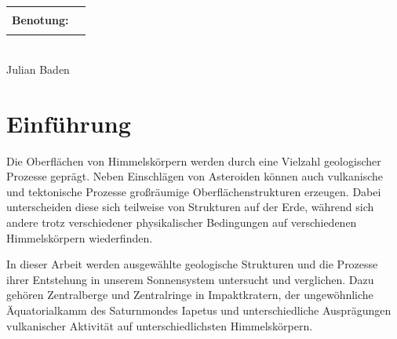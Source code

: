 \documentclass[a4paper,11pt]{article}
\newcommand{\StopBackground}{\newpage\restoregeometry\ClearShipoutPictureBG}
\begin{document}
\begin{tabular}{l  l}
    &\\
    \textbf{Benotung:}&\fbox{\rule[-1.5em]{0pt}{4em}\hspace{3cm}}\\
    &\\[0.3cm]
\end{tabular}\\


\hspace{2.8cm} Julian Baden\\[1.2cm]


\hspace{1cm} 
\hspace{2cm} 


\StopBackground





\normalsize

\pagestyle{plain}
\setcounter{page}{1}

\tableofcontents
\newpage




\onehalfspacing
\normalsize
{}






\section{Einführung}

Die Oberflächen von Himmelskörpern werden durch eine Vielzahl geologischer Prozesse geprägt.
Neben Einschlägen von Asteroiden können auch vulkanische und tektonische Prozesse großräumige Oberflächenstrukturen erzeugen.
Dabei unterscheiden diese sich teilweise von Strukturen auf der Erde, während sich andere trotz verschiedener physikalischer
Bedingungen auf verschiedenen Himmelskörpern wiederfinden. 

In dieser Arbeit werden ausgewählte geologische Strukturen
und die Prozesse ihrer Entstehung in unserem Sonnensystem untersucht und verglichen.
Dazu gehören Zentralberge und Zentralringe in Impaktkratern, der ungewöhnliche Äquatorialkamm des Saturnmondes Iapetus
und unterschiedliche Ausprägungen vulkanischer Aktivität auf unterschiedlichsten Himmelskörpern.
\end{document}
